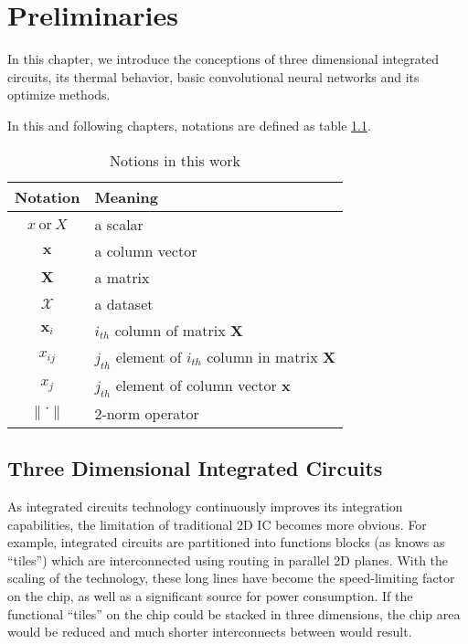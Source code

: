 

\chapter{Preliminaries}
In this chapter, we introduce the conceptions of three dimensional integrated circuits, its thermal behavior, 
basic convolutional neural networks and its optimize methods.

In this and following chapters, notations are defined as table \ref{tab::Notaion}.

\begin{table}[htb]
    \centering
    \begin{tabular}{c | l}
        \toprule
        Notation & Meaning \\
        \midrule
        $x \: \textrm{or} \: X$ & a scalar \\
        $\mathbf{x}$ & a column vector \\
        $\mathbf{X}$ & a matrix \\
        $\mathcal{X}$ & a dataset \\
        $\mathbf{x}_i$ & $i_{th}$ column of matrix $\mathbf{X}$ \\
        $x_{ij}$ & $j_{th}$ element of $i_{th}$ column in matrix $\mathbf{X}$ \\ 
        $x_j$ & $j_{th}$ element of column vector $\mathbf{x}$ \\
        $\left\|\cdot\right\|$ & 2-norm operator \\
        \bottomrule
    \end{tabular}
    \caption{Notions in this work}
    \label{tab::Notaion}
\end{table}

\section{Three Dimensional Integrated Circuits} \label{sec::3DIC}
As integrated circuits technology continuously improves its integration capabilities,
the limitation of traditional 2D IC becomes more obvious.
For example, integrated circuits are partitioned into functions blocks (as knows as ``tiles'')
which are interconnected using routing in parallel 2D planes.
With the scaling of the technology, these long lines
have become the speed-limiting factor on the chip, as well as a significant
source for power consumption. If the functional ``tiles'' on the
chip could be stacked in three dimensions, the chip area would be
reduced and much shorter interconnects between would result.

